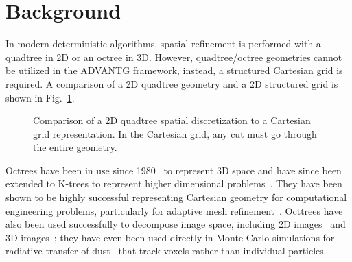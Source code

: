 \documentclass[conference]{IEEEtran}
\begin{document}
\section{Background}
In modern deterministic algorithms, spatial refinement is performed with a quadtree in 2D or an octree in 3D. However, quadtree/octree geometries cannot be utilized in the ADVANTG framework, instead, a structured Cartesian grid is required. A comparison of a 2D quadtree geometry and a 2D structured grid is shown in Fig.~\ref{fig:treecomp}. 

\begin{figure}[!t]
\centering
{}
\hfil
{}
\caption{Comparison of a 2D quadtree spatial discretization to a Cartesian grid representation. In the Cartesian grid, any cut must go through the entire geometry.}
\label{fig:treecomp}
\end{figure}

Octrees have been in use since 1980~\cite{ref:jackins1980249} to represent 3D space and have since been extended to K-trees to represent higher dimensional problems~\cite{ref:jackins1983533}. They have been shown to be highly successful representing Cartesian geometry for computational engineering problems, particularly for adaptive mesh refinement~\cite{ref:Linden201558}. Octtrees have also been used successfully to decompose image space, including 2D images~\cite{ref:Lange2004592} and 3D images~\cite{ref:udomchaiporn2013229, ref:Lee2010359}; they have even been used directly in Monte Carlo simulations for radiative transfer of dust~\cite{ref:Saftly2013} that track voxels rather than individual particles.
\end{document}
